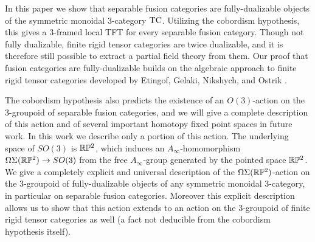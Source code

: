 \documentclass{amsart}
\begin{document}

In this paper we show that separable fusion categories are fully-dualizable objects of the symmetric monoidal 3-category $\mathrm{TC}$. Utilizing the cobordism hypothesis, this gives a 3-framed local TFT for every separable fusion category. 
Though not fully dualizable, finite rigid tensor categories are twice dualizable, and it is therefore still possible to extract a partial field theory from them.  
Our proof that fusion categories are fully-dualizable builds on the algebraic approach to finite rigid tensor categories developed by Etingof, Gelaki, Nikshych, and Ostrik \cite{EGNO, MR2119143, MR2183279, MR2097289}.

The cobordism hypothesis also predicts the existence of an $O(3)$-action on the 3-groupoid of separable fusion categories, and we will give a complete description of this action and of several important homotopy fixed point spaces in future work. In this work we describe only a portion of this action. The underlying space of $SO(3)$ is $\mathbb R \mathbb P^2$, which induces an $A_\infty$-homomorphism $\Omega \Sigma (\mathbb R \mathbb P^2) \to SO(3)$ from the free $A_\infty$-group generated by the pointed space $\mathbb R \mathbb P^2$. We give a completely explicit and universal description of the $\Omega \Sigma (\mathbb R \mathbb P^2)$-action on the 3-groupoid of fully-dualizable objects of any symmetric monoidal 3-category, in particular on separable fusion categories. Moreover this explicit description allows us to show that this action extends to an action on the 3-groupoid of finite rigid tensor categories as well (a fact not deducible from the cobordism hypothesis itself).  
\end{document}

